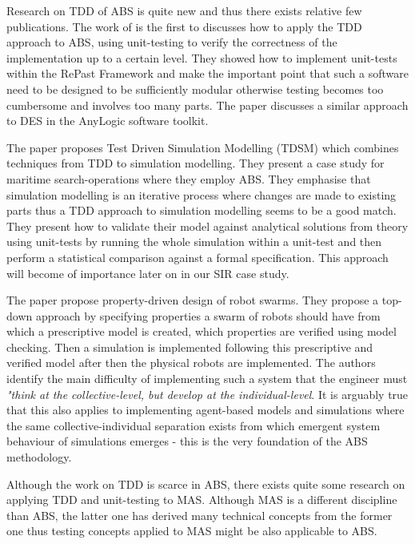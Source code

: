 Research on TDD of ABS is quite new and thus there exists relative few publications. The work of \cite{collier_test-driven_2013} is the first to discusses how to apply the TDD approach to ABS, using unit-testing to verify the correctness of the implementation up to a certain level. They showed how to implement unit-tests within the RePast Framework and make the important point that such a software need to be designed to be sufficiently modular otherwise testing becomes too cumbersome and involves too many parts. The paper \cite{asta_investigation_2014} discusses a similar approach to DES in the AnyLogic software toolkit. 

The paper \cite{onggo_test-driven_2016} proposes Test Driven Simulation Modelling (TDSM) which combines techniques from TDD to simulation modelling. They present a case study for maritime search-operations where they employ ABS. They emphasise that simulation modelling is an iterative process where changes are made to existing parts thus a TDD approach to simulation modelling seems to be a good match. They present how to validate their model against analytical solutions from theory using unit-tests by running the whole simulation within a unit-test and then perform a statistical comparison against a formal specification. This approach will become of importance later on in our SIR case study.

The paper \cite{brambilla_property-driven_2012} propose property-driven design of robot swarms. They propose a top-down approach by specifying properties a swarm of robots should have from which a prescriptive model is created, which properties are verified using model checking. Then a simulation is implemented following this prescriptive and verified model after then the physical robots are implemented. The authors identify the main difficulty of implementing such a system that the engineer must \textit{"think at the collective-level, but develop at the individual-level}. It is arguably true that this also applies to implementing agent-based models and simulations where the same collective-individual separation exists from which emergent system behaviour of simulations emerges - this is the very foundation of the ABS methodology.

Although the work on TDD is scarce in ABS, there exists quite some research on applying TDD and unit-testing to MAS. Although MAS is a different discipline than ABS, the latter one has derived many technical concepts from the former one thus testing concepts applied to MAS might be also applicable to ABS. 

